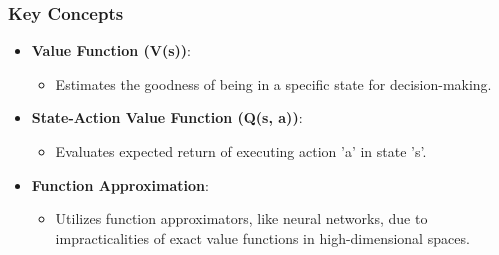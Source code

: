 \documentclass[aspectratio=169]{beamer}
\begin{document}
\begin{frame}[fragile]
    \frametitle{Key Concepts}
    \begin{itemize}
        \item \textbf{Value Function (V(s))}:
        \begin{itemize}
            \item Estimates the goodness of being in a specific state for decision-making.
        \end{itemize}
        \item \textbf{State-Action Value Function (Q(s, a))}:
        \begin{itemize}
            \item Evaluates expected return of executing action 'a' in state 's'.
        \end{itemize}
        \item \textbf{Function Approximation}:
        \begin{itemize}
            \item Utilizes function approximators, like neural networks, due to impracticalities of exact value functions in high-dimensional spaces.
        \end{itemize}
    \end{itemize}
\end{frame}
\end{document}
